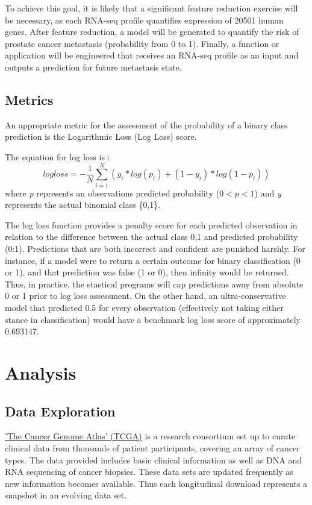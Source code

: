 \documentclass[final]{article}
\begin{document}
To achieve this goal, it is likely that a  significant feature reduction
exercise will be necessary, as each  RNA-seq profile quantifies expression of
20501 human genes.  After feature reduction, a model will be generated to
quantify the risk of prostate cancer metastasis (probability from 0 to 1).
Finally, a function or application will be engineered that receives an RNA-seq
profile as an input and outputs a prediction for future metastasis state.

\subsection{Metrics}

An appropriate metric for the assessment of the probability of a binary class prediction is the
Logarithmic Loss (Log Loss) score.

The equation for log loss is : $$ logloss = -\frac{1}{N} \sum_{i=1}^{N} (y_i
*log(p_i) + (1- y_i) * log(1-p_i)) $$ where \textit{p} represents an observations
predicted probability ($0 < \textit{p} < 1$) and \textit{y} represents the actual binomial class
\{0,1\}.

The log loss function provides a penalty score for each predicted observation in
relation to the difference between the actual class {0,1} and predicted
probability (0:1).  Predictions that are both incorrect and confident are
punished harshly.  For instance, if a model were to return a certain outcome for
binary classification (0 or 1), and that prediction was false (1 or 0), then
infinity would be returned. Thus, in practice, the stastical programs will cap
predictions away from  absolute 0 or 1 prior to log loss assessment.  On the
other hand, an ultra-conservative model that predicted 0.5 for every observation
(effectively not taking either stance in classification) would have a benchmark
log loss score of approximately 0.693147.

\section{Analysis}

\subsection{Data Exploration}

\href{www.http://cancergenome.nih.gov/}{'The Cancer Genome Atlas' (TCGA)} is a
research consortium set up to curate clinical data from thousands of patient
participants, covering an array of cancer types.   The data provided includes basic
clinical information as well as DNA and RNA sequencing of cancer biopsies. These
data sets are updated frequently as new information becomes available.  Thus
each longitudinal download represents a snapshot in an evolving data set.
\end{document}
